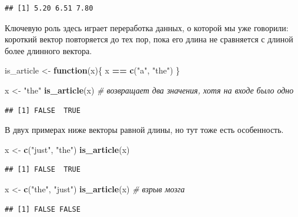 \documentclass[
]{book}
\newenvironment{Shaded}{\begin{snugshade}}{\end{snugshade}}
\newcommand{\CommentTok}[1]{\textcolor[rgb]{0.56,0.35,0.01}{\textit{#1}}}
\newcommand{\ControlFlowTok}[1]{\textcolor[rgb]{0.13,0.29,0.53}{\textbf{#1}}}
\newcommand{\FunctionTok}[1]{\textcolor[rgb]{0.13,0.29,0.53}{\textbf{#1}}}
\newcommand{\NormalTok}[1]{#1}
\newcommand{\OtherTok}[1]{\textcolor[rgb]{0.56,0.35,0.01}{#1}}
\newcommand{\SpecialCharTok}[1]{\textcolor[rgb]{0.81,0.36,0.00}{\textbf{#1}}}
\newcommand{\StringTok}[1]{\textcolor[rgb]{0.31,0.60,0.02}{#1}}
\theoremstyle{definition}
\theoremstyle{definition}
\theoremstyle{definition}
\theoremstyle{definition}
\theoremstyle{remark}
\begin{document}
\begin{verbatim}
## [1] 5.20 6.51 7.80
\end{verbatim}

Ключевую роль здесь играет переработка данных, о которой мы уже говорили: короткий вектор повторяется до тех пор, пока его длина не сравняется с длиной более длинного вектора.

\begin{Shaded}
\begin{Highlighting}[]
\NormalTok{is\_article }\OtherTok{\textless{}{-}} \ControlFlowTok{function}\NormalTok{(x)\{}
\NormalTok{  x }\SpecialCharTok{==} \FunctionTok{c}\NormalTok{(}\StringTok{"a"}\NormalTok{, }\StringTok{"the"}\NormalTok{)}
\NormalTok{\}}

\NormalTok{x }\OtherTok{\textless{}{-}} \StringTok{"the"}
\FunctionTok{is\_article}\NormalTok{(x) }\CommentTok{\# возвращает два значения, хотя на входе было одно}
\end{Highlighting}
\end{Shaded}

\begin{verbatim}
## [1] FALSE  TRUE
\end{verbatim}

В двух примерах ниже векторы равной длины, но тут тоже есть особенность.

\begin{Shaded}
\begin{Highlighting}[]
\NormalTok{x }\OtherTok{\textless{}{-}} \FunctionTok{c}\NormalTok{(}\StringTok{"just"}\NormalTok{, }\StringTok{"the"}\NormalTok{)}
\FunctionTok{is\_article}\NormalTok{(x) }
\end{Highlighting}
\end{Shaded}

\begin{verbatim}
## [1] FALSE  TRUE
\end{verbatim}

\begin{Shaded}
\begin{Highlighting}[]
\NormalTok{x }\OtherTok{\textless{}{-}} \FunctionTok{c}\NormalTok{(}\StringTok{"the"}\NormalTok{, }\StringTok{"just"}\NormalTok{)}
\FunctionTok{is\_article}\NormalTok{(x) }\CommentTok{\# взрыв мозга}
\end{Highlighting}
\end{Shaded}

\begin{verbatim}
## [1] FALSE FALSE
\end{verbatim}
\end{document}
